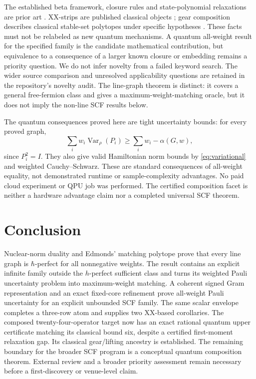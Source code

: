 \documentclass[11pt,a4paper]{article}
\theoremstyle{remark}\newtheorem{remark}[theorem]{Remark}
\begin{document}
The established beta framework, closure rules and state-polynomial
relaxations are prior art \cite{xu}. XX-strips are published classical
objects \cite{cs}; gear composition describes classical stable-set
polytopes under specific hypotheses \cite{gear}. These facts must not
be relabeled as new quantum mechanisms. A quantum all-weight result for
the specified family is the candidate mathematical contribution, but
equivalence to a consequence of a larger known closure or embedding
remains a priority question. We do not infer novelty from a failed
keyword search. The wider source comparison and unresolved applicability
questions are retained in the repository's novelty audit. The line-graph
theorem is distinct: it covers a general free-fermion class and gives a
maximum-weight-matching oracle, but it does not imply the non-line SCF
results below.

The quantum consequences proved here are tight uncertainty bounds:
for every proved graph,
\[
 \sum_iw_i\operatorname{Var}_\rho(P_i)
 \geq \sum_iw_i-\alpha(G,w),
\]
since $P_i^2=I$. They also give valid Hamiltonian norm bounds by
\eqref{eq:variational} and weighted Cauchy--Schwarz. These are standard
consequences of all-weight equality, not demonstrated runtime or
sample-complexity advantages. No paid cloud experiment or QPU job was
performed. The certified composition facet is neither a hardware
advantage claim nor a completed universal SCF theorem.

\section{Conclusion}
Nuclear-norm duality and Edmonds' matching polytope prove that every line
graph is $\hbar$-perfect for all nonnegative weights. The result contains
an explicit infinite family outside the $h$-perfect sufficient class and
turns its weighted Pauli uncertainty problem into maximum-weight matching.
A coherent signed Gram representation and an exact fixed-core
refinement prove all-weight Pauli uncertainty for an explicit unbounded
SCF family. The same scalar envelope completes a three-row atom and
supplies two XX-based corollaries. The composed twenty-four-operator
target now has an exact rational quantum upper certificate matching
its classical bound six, despite a certified first-moment relaxation
gap. Its classical gear/lifting ancestry is established. The remaining
boundary for the broader SCF program is a conceptual quantum composition
theorem. External review and a broader priority assessment remain
necessary before a first-discovery or venue-level claim.
\end{document}

